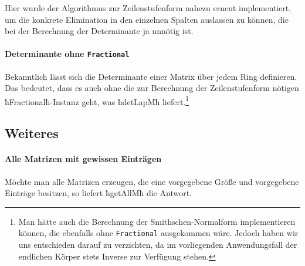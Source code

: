Hier wurde der Algorithmus zur Zeilenstufenform nahezu erneut implementiert, um
die konkrete Elimination in den einzelnen Spalten auslassen zu können, die bei
der Berechnung der Determinante ja unnötig ist.

\paragraph{Determinante ohne \lstinline{Fractional}} Bekanntlich lässt sich die
Determinante einer Matrix über jedem Ring definieren. Das bedeutet, dass es
auch ohne die zur Berechnung der Zeilenstufenform nötigen ħFractionalħ-Instanz
geht, was ħdetLapMħ liefert.\footnote{Man hätte auch die Berechnung der
Smithschen-Normalform implementieren können, die ebenfalls ohne
\lstinline{Fractional}
ausgekommen wäre. Jedoch haben wir uns entschieden darauf zu verzichten, da im
vorliegenden Anwendungsfall der endlichen Körper stets Inverse zur Verfügung
stehen.}



\subsection{Weiteres}

\paragraph{Alle Matrizen mit gewissen Einträgen} Möchte man alle Matrizen
erzeugen, die eine vorgegebene Größe und vorgegebene Einträge besitzen, so
liefert ħgetAllMħ die Antwort.

